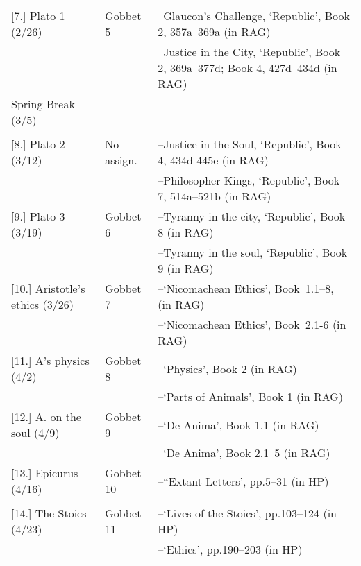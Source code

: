 \documentclass[article,oneside]{memoir}
\begin{document}
\begin{center}
\begin{longtable}{p{4.5cm}p{2cm}p{6cm}}
[7.] Plato 1 (2/26)			 			& Gobbet 5		& --Glaucon's Challenge, `Republic', Book 2, 357a--369a (in RAG)  \\
				     			 	& 	      			& --Justice in the City, `Republic', Book 2, 369a--377d; Book 4, 427d--434d (in RAG) \\  [1.8\baselineskip]

Spring Break (3/5)					& 				 & 	\\
								& 				 &   \\ [1.8\baselineskip]	

[8.] Plato 2	(3/12)					& No assign.		& --Justice in the Soul, `Republic', Book 4, 434d-445e (in RAG)\\
	            						&		      		& --Philosopher Kings, `Republic', Book 7, 514a--521b (in RAG) \\  [1.8\baselineskip]

[9.] Plato 3	(3/19)					& Gobbet 6		& --Tyranny in the city, `Republic', Book 8 (in RAG) \\
		            					&		      		& --Tyranny in the soul, `Republic', Book 9  (in RAG)\\  [1.8\baselineskip]


[10.] Aristotle's ethics	(3/26)			& Gobbet 7		& --`Nicomachean Ethics', Book\ 1.1--8, (in RAG) \\
			    					& 				& --`Nicomachean Ethics', Book\ 2.1-6 (in RAG) \\ [1.8\baselineskip]


[11.] A's physics (4/2)			& Gobbet 8		& --`Physics', Book 2 (in RAG) \\ 
				   			   	&			      	& --`Parts of Animals', Book 1 (in RAG)  \\ [1.8\baselineskip]

						
[12.] A. on the soul (4/9)	      		& Gobbet 9		&  --`De Anima', Book 1.1 (in RAG) \\
				   			   	&			      	& --`De Anima', Book 2.1--5 (in RAG) \\  [1.8\baselineskip]

						 
[13.] Epicurus (4/16)	    				& Gobbet 10		& --``Extant Letters', pp.5--31 (in HP)\\
			      					&			      	&  \\ [1.8\baselineskip]

[14.] The Stoics	(4/23)			  	& Gobbet 11		&--`Lives of the Stoics', pp.103--124 (in HP) \\ 
			    				  	&		      		& --`Ethics', pp.190--203 (in HP) \\[1.8\baselineskip]


\end{longtable}
\end{center}
\end{document}
